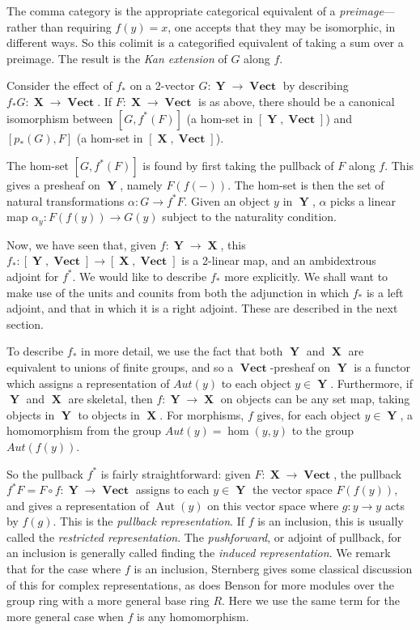 \documentclass[10pt]{amsart}
\numberwithin{theorem}{subsection}
\newcommand{\ra}{\mathop{\rightarrow}}
\newcommand{\opname}[1]{\operatorname{#1}}
\newcommand{\catname}[1]{\boldsymbol{\opname{{#1}}}}
\newcommand{\X}{\catname{X}}
\newcommand{\Y}{\catname{Y}}
\newcommand{\V}{\catname{Vect}}
\begin{document}
The comma category is the appropriate categorical equivalent of a
\textit{preimage}---rather than requiring $f(y) = x$, one accepts that
they may be isomorphic, in different ways.  So this colimit is a
categorified equivalent of taking a sum over a preimage.  The result
is the \textit{Kan extension} of $G$ along $f$.

Consider the effect of $f_{\ast}$ on a 2-vector $G:\Y \ra \V$ by
describing $f_{\ast}G : \X \ra \V$.  If $F : \X \ra \V$ is as above,
there should be a canonical isomorphism between $[G,f^{\ast}(F)]$ (a
hom-set in $[\Y,\V]$) and $[p_{\ast}(G),F]$ (a hom-set in $[\X,\V]$).

The hom-set $[G,f^{\ast}(F)]$ is found by first taking the pullback of
$F$ along $f$.  This gives a presheaf on $\Y$, namely $F(f(-))$.  The
hom-set is then the set of natural transformations $\alpha : G \ra
f^{\ast}F$.  Given an object $y$ in $\Y$, $\alpha$ picks a
linear map $\alpha_y : F(f(y)) \ra G(y)$ subject to the naturality
condition.

Now, we have seen that, given $f: \Y \rightarrow \X$, this $f_{\ast} :
[\Y,\V] \rightarrow [\X,\V]$ is a 2-linear map, and an ambidextrous
adjoint for $f^{\ast}$.  We would like to describe $f_{\ast}$ more
explicitly.  We shall want to make use of the units and
counits from both the adjunction in which $f_{\ast}$ is a left
adjoint, and that in which it is a right adjoint.  These are described
in the next section.

To describe $f_{\ast}$ in more detail, we use the fact that both $\Y$
and $\X$ are equivalent to unions of finite groups, and so a
$\V$-presheaf on $\Y$ is a functor which assigns a representation of
$Aut(y)$ to each object $y \in \Y$.  Furthermore, if $\Y$ and $\X$ are
skeletal, then $f : \Y \ra \X$ on objects can be any set map, taking
objects in $\Y$ to objects in $\X$.  For morphisms, $f$ gives, for
each object $y \in \Y$, a homomorphism from the group $Aut(y) =
\hom(y,y)$ to the group $Aut(f(y))$.

So the pullback $f^{\ast}$ is fairly straightforward: given $F : \X
\ra \V$, the pullback $f^{\ast}F = F \circ f : \Y \ra \V$ assigns to
each $y \in \Y$ the vector space $F(f(y))$, and gives a representation
of $\opname{Aut}(y)$ on this vector space where $g : y \ra y$ acts by
$f(g)$.  This is the \textit{pullback representation}.  If $f$ is an
inclusion, this is usually called the \textit{restricted
  representation}.  The \textit{pushforward}, or adjoint of pullback,
for an inclusion is generally called finding the \textit{induced
  representation}.  We remark that for the case where $f$ is an
inclusion, Sternberg \cite{sternberg} gives some classical discussion
of this for complex representations, as does Benson \cite{benson} for
more modules over the group ring with a more general base ring $R$.
Here we use the same term for the more general case when $f$ is any
homomorphism.
\end{document}
